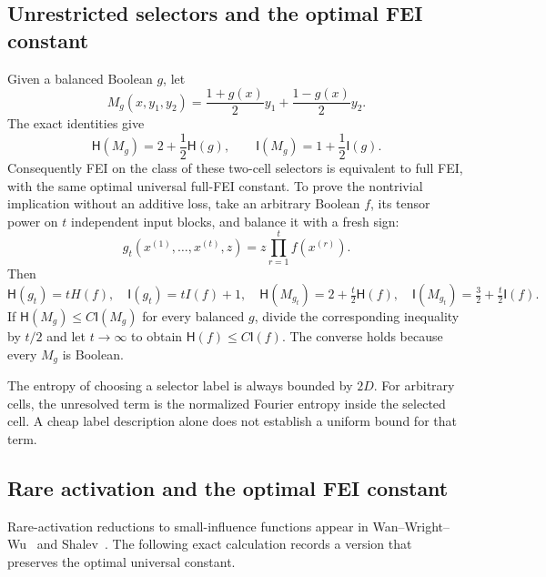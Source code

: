\documentclass[11pt]{amsart}
\theoremstyle{definition}
\theoremstyle{remark}
\newcommand{\HH}{\mathsf H}
\newcommand{\I}{\mathsf I}
\begin{document}
\subsection{Unrestricted selectors and the optimal FEI constant}

Given a balanced Boolean $g$, let
\[
 M_g(x,y_1,y_2)=\frac{1+g(x)}2y_1+\frac{1-g(x)}2y_2.
\]
The exact identities give
\[
 \HH(M_g)=2+\frac12\HH(g),\qquad \I(M_g)=1+\frac12\I(g).
\]
Consequently FEI on the class of these two-cell selectors is equivalent
to full FEI, with the same optimal universal full-FEI constant.
To prove the nontrivial implication without an additive loss, take an
arbitrary Boolean $f$, its tensor power on $t$ independent input blocks,
and balance it with a fresh sign:
\[
 g_t(x^{(1)},\ldots,x^{(t)},z)
   =z\prod_{r=1}^t f(x^{(r)}).
\]
Then
\[
 \HH(g_t)=tH(f),\quad \I(g_t)=tI(f)+1,
\quad \HH(M_{g_t})=2+\tfrac t2\HH(f),\quad
 \I(M_{g_t})=\tfrac32+\tfrac t2\I(f).
\]
If $\HH(M_g)\le C \I(M_g)$ for every balanced $g$, divide the corresponding
inequality by $t/2$ and let $t\to\infty$ to obtain $\HH(f)\le C \I(f)$.
The converse holds because every $M_g$ is Boolean.

The entropy of choosing a selector label is always bounded by $2D$.
For arbitrary cells, the unresolved term is the normalized Fourier
entropy inside the selected cell. A cheap label description alone does
not establish a uniform bound for that term.

\subsection{Rare activation and the optimal FEI constant}\label{sec:rare-equivalence}

Rare-activation reductions to small-influence functions appear in
Wan--Wright--Wu~\cite{WWW14} and Shalev~\cite{Shalev18}.
The following exact calculation records a version that preserves the
optimal universal constant.
\end{document}
